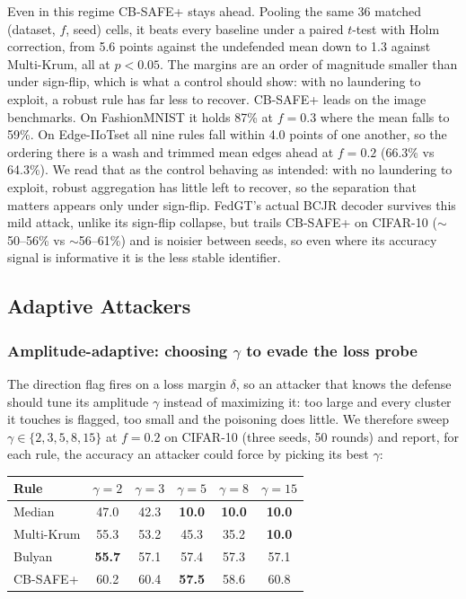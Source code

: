 \documentclass[lettersize,journal]{IEEEtran}
\begin{document}
Even in this regime CB-SAFE+ stays ahead. Pooling the same 36 matched (dataset, $f$,
seed) cells, it beats every baseline under a paired $t$-test with Holm correction,
from 5.6 points against the undefended mean down to 1.3 against Multi-Krum, all at
$p{<}0.05$. The margins are an order of magnitude smaller than under sign-flip, which
is what a control should show: with no laundering to exploit, a robust rule has far
less to recover.
CB-SAFE+ leads on the image benchmarks. On FashionMNIST it holds 87\% at
$f{=}0.3$ where the mean falls to 59\%. On Edge-IIoTset all nine rules fall
within 4.0 points of one another, so the ordering there is a wash and trimmed mean
edges ahead at $f{=}0.2$ (66.3\% vs 64.3\%). We read that as the
control behaving as intended: with no laundering to exploit, robust aggregation has
little left to recover, so the separation that matters appears only under sign-flip. FedGT's actual BCJR decoder survives this
mild attack, unlike its sign-flip collapse, but trails CB-SAFE+ on CIFAR-10
($\sim$50--56\% vs $\sim$56--61\%) and is noisier between seeds, so even where its
accuracy signal is informative it is the less stable identifier.



\subsection{Adaptive Attackers}
\subsubsection{Amplitude-adaptive: choosing $\gamma$ to evade the loss probe} The
direction flag fires on a loss margin $\delta$, so an attacker that knows the defense
should tune its amplitude $\gamma$ instead of maximizing it: too large and every
cluster it touches is flagged, too small and the poisoning does little. We therefore
sweep $\gamma\in\{2,3,5,8,15\}$ at $f{=}0.2$ on CIFAR-10 (three seeds, 50 rounds) and
report, for each rule, the accuracy an attacker could force by picking its best
$\gamma$:

\begin{center}\footnotesize
\begin{tabular}{@{}lccccc@{}}\toprule
Rule & $\gamma{=}2$ & $\gamma{=}3$ & $\gamma{=}5$ & $\gamma{=}8$ & $\gamma{=}15$\\\midrule
Median & 47.0 & 42.3 & \textbf{10.0} & \textbf{10.0} & \textbf{10.0}\\
Multi-Krum & 55.3 & 53.2 & 45.3 & 35.2 & \textbf{10.0}\\
Bulyan & \textbf{55.7} & 57.1 & 57.4 & 57.3 & 57.1\\
CB-SAFE+ & 60.2 & 60.4 & \textbf{57.5} & 58.6 & 60.8\\
\bottomrule\end{tabular}
\end{center}
\end{document}
